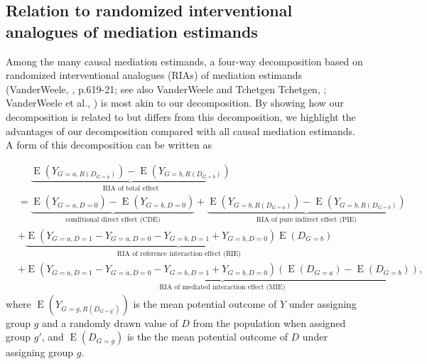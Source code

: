 \documentclass[12pt,a4paper]{article}
\newcommand{\E}{\operatorname{E}}
\begin{document}
\subsection{Relation to randomized interventional analogues of mediation estimands}
Among the many causal mediation estimands, a four-way decomposition based on randomized interventional analogues (RIAs) of mediation estimands (VanderWeele,  \citeyear{vanderweele_explanation_2015}, p.619-21; see also VanderWeele and Tchetgen Tchetgen, \citeyear{vanderweele_mediation_2017}; VanderWeele et al., \citeyear{vanderweele_effect_2014}) is most akin to our decomposition. By showing how our decomposition is related to but differs from this decomposition, we highlight the advantages of our decomposition compared with all causal mediation estimands. A form of this decomposition can be written as 

\begin{align*}
    &\phantom{{}={}} \underbrace{\E \left(Y_{G=a, R(D_{G=a})} \right)-\E \left(Y_{G=b, R(D_{G=b})} \right)}_{\text{RIA of total effect}} \\
    &=
    \underbrace{\E(Y_{G=a, D=0})-\E(Y_{G=b, D=0})}_{\text{conditional direct effect (CDE)}} +
    \underbrace{\E \left(Y_{G=b, R(D_{G=a})} \right)-\E \left(Y_{G=b, R(D_{G=b})} \right)}_{\text{RIA of pure indirect effect (PIE)}} \\
    & + \underbrace{\E(Y_{G=a, D=1}-Y_{G=a, D=0} - Y_{G=b, D=1} + Y_{G=b, D=0}) \E(D_{G=b})}_{\text{RIA of reference interaction effect (RIE)}} \\
    & + \underbrace{\E(Y_{G=a, D=1}-Y_{G=a, D=0} - Y_{G=b, D=1} + Y_{G=b, D=0}) \left(\E(D_{G=a})-\E(D_{G=b})\right)}_{\text{RIA of mediated interaction effect (MIE)}}, 
\end{align*}
where $\E \left(Y_{G=g, R(D_{G=g'})} \right)$ is the mean potential outcome of $Y$ under assigning group $g$ and a randomly drawn value of $D$ from the population when assigned group $g'$, and $\E(D_{G=g})$ is the the mean potential outcome of $D$ under assigning group $g$.
\end{document}
